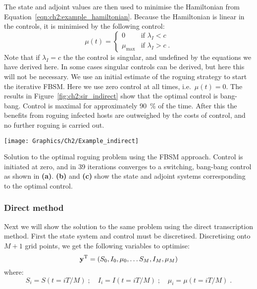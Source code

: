 \begin{example}
    The state and adjoint values are then used to minimise the Hamiltonian from Equation~\ref{eqn:ch2:example_hamiltonian}. Because the Hamiltonian is linear in the controls, it is minimised by the following control:
    \begin{equation}
        \mu(t) = \begin{cases}
            0 & \text{if }\lambda_I < c \\
            \mu_\text{max} & \text{if }\lambda_I > c\;.
        \end{cases}
    \end{equation}
    Note that if $\lambda_I=c$ the the control is singular, and undefined by the equations we have derived here. In some cases singular controls can be derived, but here this will not be necessary. We use an initial estimate of the roguing strategy to start the iterative FBSM. Here we use zero control at all times, i.e.\ $\mu(t)=0$. The results in Figure~\ref{fig:ch2:sir_indirect} show that the optimal control is bang-bang. Control is maximal for approximately \SI{90}{\percent} of the time. After this the benefits from roguing infected hosts are outweighed by the costs of control, and no further roguing is carried out.

    {
    \centering
    \captionsetup{type=figure}
        \texttt{[image: Graphics/Ch2/Example\_indirect]}
    \caption[Optimal roguing strategy using the indirect approach]{Solution to the optimal roguing problem using the FBSM approach. Control is initiated at zero, and in 39 iterations converges to a switching, bang-bang control as shown in \textbf{(a)}. \textbf{(b)} and \textbf{(c)} show the state and adjoint systems corresponding to the optimal control.\label{fig:ch2:sir_indirect}}
    }

    \subsubsection{Direct method}
    Next we will show the solution to the same problem using the direct transcription method. First the state system and control must be discretised. Discretising onto $M+1$ grid points, we get the following variables to optimise:
    \begin{equation}
        \mathbf{\bm{y}}^\mathrm{T} = \left(S_0, I_0, \mu_0, \ldots S_M, I_M, \mu_M\right)
    \end{equation}
    where:
    \begin{equation}
            S_i = S(t=iT/M)\;; \quad I_i = I(t=iT/M)\;; \quad \mu_i = \mu(t=iT/M)\;.
    \end{equation}


\end{example}
